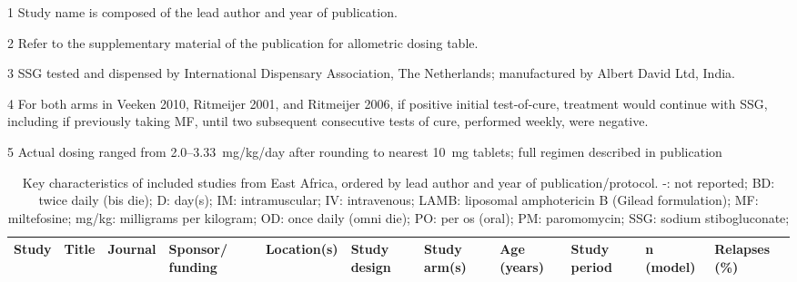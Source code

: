
\scriptsize
\begin{ThreePartTable}
  \begin{TableNotes}
    \item[1] Study name is composed of the lead author and year of publication.
    \item[2] Refer to the supplementary material of the publication for allometric dosing table\cite{mbui2019}.
    \item[3] SSG tested and dispensed by International Dispensary Association, The Netherlands; manufactured by Albert David Ltd, India.
    \item[4] For both arms in Veeken 2010, Ritmeijer 2001, and Ritmeijer 2006, if positive initial test-of-cure, treatment would continue with SSG, including if previously taking MF, until two subsequent consecutive tests of cure, performed weekly, were negative.
    \item[5] Actual dosing ranged from 2.0--3.33~mg/kg/day after rounding to nearest 10~mg tablets; full regimen described in publication\cite{wasunna2016}
  \end{TableNotes}

  \begin{longtable}[c]{L{1cm} L{4cm} L{1cm} L{1.5cm} L{3.5cm} L{2.5cm} L{3.7cm} L{1cm} L{1cm} L{1cm} L{1.3cm}}
    \caption{Key characteristics of included studies from East Africa, ordered by lead author and year of publication/protocol. -: not reported; BD: twice daily (bis die); D: day(s); IM: intramuscular; IV: intravenous; LAMB: liposomal amphotericin B (Gilead formulation); MF: miltefosine; mg/kg: milligrams per kilogram; OD: once daily (omni die); PO: per os (oral); PM: paromomycin; SSG: sodium stibogluconate; \label{tab:ea_study}}                                                                                                                                                                                                                                                                                                                                                                                                                                 \\
    \toprule
    Study                     & Title                                                                                                                                                                                                 & Journal                  & Sponsor/ funding                     & Location(s)                                                                                                                                                                        & Study design                                                                       & Study arm(s)                                                                                                                                                                                                       & Age (years) & Study period & n (model) & Relapses (\%) \\ \midrule
    \endfirsthead


\end{longtable}
\end{ThreePartTable}
